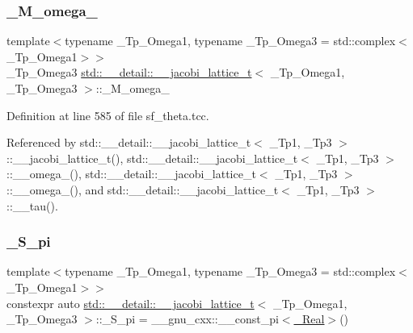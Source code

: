 \subsubsection{\texorpdfstring{\+\_\+\+M\+\_\+omega\+\_}{\_M\_omega\_3}}
{\footnotesize\ttfamily template$<$typename \+\_\+\+Tp\+\_\+\+Omega1, typename \+\_\+\+Tp\+\_\+\+Omega3 = std\+::complex$<$\+\_\+\+Tp\+\_\+\+Omega1$>$$>$ \\
\+\_\+\+Tp\+\_\+\+Omega3 \hyperlink{structstd_1_1____detail_1_1____jacobi__lattice__t}{std\+::\+\_\+\+\_\+detail\+::\+\_\+\+\_\+jacobi\+\_\+lattice\+\_\+t}$<$ \+\_\+\+Tp\+\_\+\+Omega1, \+\_\+\+Tp\+\_\+\+Omega3 $>$\+::\+\_\+\+M\+\_\+omega\+\_}



Definition at line 585 of file sf\+\_\+theta.\+tcc.



Referenced by std\+::\+\_\+\+\_\+detail\+::\+\_\+\+\_\+jacobi\+\_\+lattice\+\_\+t$<$ \+\_\+\+Tp1, \+\_\+\+Tp3 $>$\+::\+\_\+\+\_\+jacobi\+\_\+lattice\+\_\+t(), std\+::\+\_\+\+\_\+detail\+::\+\_\+\+\_\+jacobi\+\_\+lattice\+\_\+t$<$ \+\_\+\+Tp1, \+\_\+\+Tp3 $>$\+::\+\_\+\+\_\+omega\+\_(), std\+::\+\_\+\+\_\+detail\+::\+\_\+\+\_\+jacobi\+\_\+lattice\+\_\+t$<$ \+\_\+\+Tp1, \+\_\+\+Tp3 $>$\+::\+\_\+\+\_\+omega\+\_(), and std\+::\+\_\+\+\_\+detail\+::\+\_\+\+\_\+jacobi\+\_\+lattice\+\_\+t$<$ \+\_\+\+Tp1, \+\_\+\+Tp3 $>$\+::\+\_\+\+\_\+tau().

\mbox{\label{structstd_1_1____detail_1_1____jacobi__lattice__t_ab89d6e32a9058989923774c3cf5a8c9a}} 
\subsubsection{\texorpdfstring{\+\_\+\+S\+\_\+pi}{\_S\_pi}}
{\footnotesize\ttfamily template$<$typename \+\_\+\+Tp\+\_\+\+Omega1, typename \+\_\+\+Tp\+\_\+\+Omega3 = std\+::complex$<$\+\_\+\+Tp\+\_\+\+Omega1$>$$>$ \\
constexpr auto \hyperlink{structstd_1_1____detail_1_1____jacobi__lattice__t}{std\+::\+\_\+\+\_\+detail\+::\+\_\+\+\_\+jacobi\+\_\+lattice\+\_\+t}$<$ \+\_\+\+Tp\+\_\+\+Omega1, \+\_\+\+Tp\+\_\+\+Omega3 $>$\+::\+\_\+\+S\+\_\+pi = \+\_\+\+\_\+gnu\+\_\+cxx\+::\+\_\+\+\_\+const\+\_\+pi$<$\hyperlink{structstd_1_1____detail_1_1____jacobi__lattice__t_afdf4a474bd195f7b6062b4782202adc7}{\+\_\+\+Real}$>$()\hspace{0.3cm}{\ttfamily [static]}}




